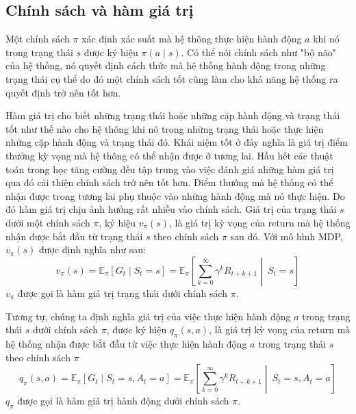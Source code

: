 
\subsection{Chính sách và hàm giá trị} \label{sec:policy_value}
Một chính sách $\pi$ xác định xác suất mà hệ thông thực hiện hành động $a$ khi nó trong trạng thái $s$ được ký hiệu $\pi(a \mid s)$. Có thể nói chính sách như "bộ não" của hệ thống, nó quyết định cách thức mà hệ thống hành động trong những trạng thái cụ thể do đó một chính sách tốt cũng làm cho khả năng hệ thống ra quyết định trở nên tốt hơn.

Hàm giá trị cho biết những trạng thái hoặc những cặp hành động và trạng thái tốt như thế nào cho hệ thông khi nó trong những trạng thái hoặc thực hiện những cặp hành động và trạng thái đó. Khái niệm tốt ở đây nghĩa là giá trị điểm thưởng kỳ vọng mà hệ thông có thể nhận được ở tương lai. Hầu hết các thuật toán trong học tăng cường đều tập trung vào việc đánh giá những hàm giá trị qua đó cải thiện chính sách trở nên tốt hơn. Điểm thưởng mà hệ thống có thể nhận được trong tương lai phụ thuộc vào những hành động mà nó thực hiện. Do đó hàm giá trị chịu ảnh hưởng rất nhiều vào chính sách. Giá trị của trạng thái $s$ dưới một chính sách $\pi$, ký hiệu $v_{\pi}(s)$, là giá trị kỳ vọng của return mà hệ thống nhận được bắt đầu từ trạng thái $s$ theo chính sách $\pi$ sau đó. Với mô hình MDP, $v_{\pi}(s)$ được định nghĩa như sau:
\begin{equation}
v_{\pi}(s) = \mathbb{E}_{\pi}\left [\mathit{G}_t \mid \mathit{S}_{t} = s\right ] = \mathbb{E}_{\pi}\left [\sum_{k = 0}^{\infty}\gamma^{k}\mathit{R}_{t+k+1} \middle|\ \mathit{S}_t= s\right ]
\end{equation}
$v_{\pi}$ được gọi là hàm giá trị trạng thái dưới chính sách $\pi$.

Tương tự, chúng ta định nghĩa giá trị của việc thực hiện hành động $a$ trong trạng thái $s$ dưới chính sách $\pi$, được ký hiệu $q_{\pi}(s,a)$, là giá trị kỳ vọng của return mà hệ thống nhận được bắt đầu từ việc thực hiện hành động $a$ trong trạng thái $s$ theo chính sách $\pi$
\begin{equation}
\label{action_value}
q_{\pi}(s,a) = \mathbb{E}_{\pi}\left [\mathit{G}_t \mid \mathit{S}_{t} = s, \mathit{A}_{t} = a  \right ] = \mathbb{E}_{\pi}\left [\sum_{k = 0}^{\infty}\gamma^{k}\mathit{R}_{t+k+1} \middle|\ \mathit{S}_t= s, \mathit{A}_{t} = a \right ]
\end{equation}
$q_{\pi}$ được gọi là hàm giá trị hành động dưới chính sách $\pi$.

